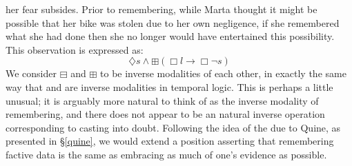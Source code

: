 her fear subsides.  Prior to remembering, while
Marta thought it might be possible that her bike was stolen due to her
own negligence,
if she remembered what she had done then she no longer would have
entertained this possibility.  This observation is expressed as:
\begin{equation} 
\diamondsuit s \wedge \boxplus (\Box  l \rightarrow \Box  \neg s)
\end{equation}
We consider $\boxminus$ and $\boxplus$ to be inverse modalities of each other,
in exactly the same way that  and  are inverse
modalities in temporal logic. This is perhaps a little unusual; it is arguably
more natural to think of  as the inverse modality of
remembering, and there does not appear to be an natural inverse operation
corresponding to casting into doubt.  Following the idea of the  due to Quine, as presented in \S\ref{quine}, we would 
extend a position asserting that remembering factive data is the 
same as embracing as much of one's evidence as possible.


